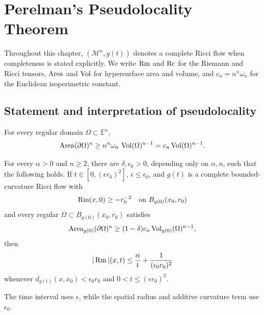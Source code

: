 \chapter[21]{Perelman's Pseudolocality Theorem}
\label{ch:chow-iii-perelmans-pseudolocality}

Throughout this chapter, \((\mathcal M^n,g(t))\) denotes a complete Ricci flow
when completeness is stated explicitly.  We write \(\operatorname{Rm}\) and \(\operatorname{Rc}\) for the
Riemann and Ricci tensors, \(\operatorname{Area}\) and \(\operatorname{Vol}\) for hypersurface area and
volume, and \(c_n=n^n\omega_n\) for the Euclidean isoperimetric constant.

\section{Statement and interpretation of pseudolocality}

\begin{proposition}
\label{prop:chow-iii-euclidean-isoperimetric}

For every regular domain \(\Omega\subset\mathbb E^n\),
\[
  \operatorname{Area}(\partial\Omega)^n\ge n^n\omega_n\,\operatorname{Vol}(\Omega)^{n-1}=c_n\operatorname{Vol}(\Omega)^{n-1}.
\]
\end{proposition}

\begin{theorem}
\label{thm:chow-iii-perelman-pseudolocality}


For every \(\alpha>0\) and \(n\ge2\), there are \(\delta,\epsilon_0>0\),
depending only on \(\alpha,n\), such that the following holds.  If
\(t\in[0,(\epsilon r_0)^2]\), \(\epsilon\le\epsilon_0\), and \(g(t)\) is a
complete bounded-curvature Ricci flow with
\[
\operatorname{Rm}(x,0)\ge-r_0^{-2}\quad\text{on }B_{g(0)}(x_0,r_0)
\]
and every regular \(\Omega\subset B_{g(0)}(x_0,r_0)\) satisfies
\[
\operatorname{Area}_{g(0)}(\partial\Omega)^n\ge(1-\delta)c_n\operatorname{Vol}_{g(0)}(\Omega)^{n-1},
\]
then
\[
|\operatorname{Rm}|(x,t)\le\frac{\alpha}{t}+\frac1{(\epsilon_0r_0)^2}
\]
whenever \(d_{g(t)}(x,x_0)<\epsilon_0r_0\) and
\(0<t\le(\epsilon r_0)^2\).
\end{theorem}

\begin{remark}
\label{rem:chow-iii-pseudolocality-scales}

The time interval uses \(\epsilon\), while the spatial radius and additive
curvature term use \(\epsilon_0\).
\end{remark}

